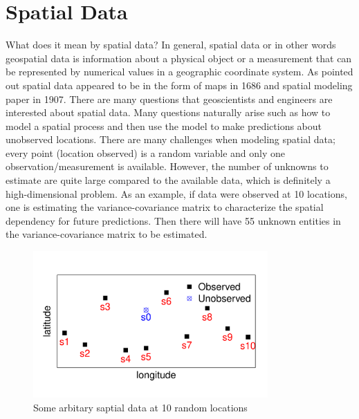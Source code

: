 
%
%
%
%

% 
% 

\section{Spatial Data}

What does it mean by spatial data? In general, spatial data or in other words geospatial data is information about a physical object or a measurement that can be represented by numerical values in a geographic coordinate system. As \cite{Cressie1993} pointed out spatial data appeared to be in the form of maps in 1686 and spatial modeling paper in 1907. There are many questions that geoscientists and engineers are interested about spatial data. Many questions naturally arise such as how to model a spatial process and then use the model to make predictions about unobserved locations. There are many challenges when modeling spatial data; every point (location observed) is a random variable and only one observation/measurement is available. However, the number of unknowns to estimate are quite large compared to the available data, which is definitely a high-dimensional problem. As an example, if data were observed at 10 locations, one is estimating the variance-covariance matrix to characterize the spatial dependency for future predictions. Then there will have 55 unknown entities in the variance-covariance matrix to be estimated.

\begin{figure}[H]
\label{MSU_data_latitude}
\centering
\includegraphics [width=0.8\textwidth, keepaspectratio]{graphs/location.pdf}
\caption{Some arbitary saptial data at 10 random locations}
\end{figure}


